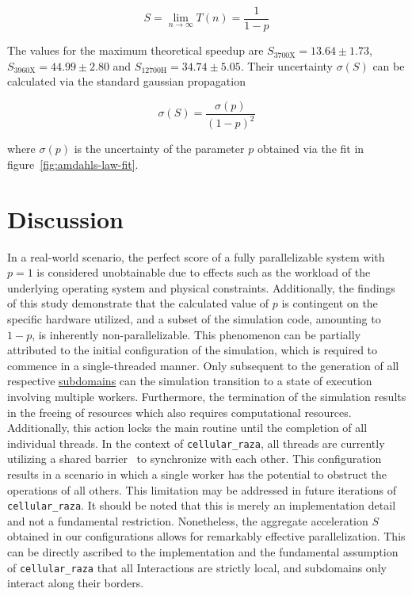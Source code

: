 \documentclass[fontsize=11pt,a4paper]{article}
\begin{document}
\begin{equation}
    S = \lim\limits_{n\rightarrow\infty} T(n) = \frac{1}{1-p}
    \label{eq:amdahls-law-maximum-speedup}
\end{equation}

The values for the maximum theoretical speedup are $S_\text{3700X}=13.64\pm1.73$,
$S_\text{3960X}=44.99\pm2.80$ and $S_\text{12700H}=34.74\pm5.05$.
Their uncertainty $\sigma(S)$ can be calculated via the standard gaussian propagation

\begin{equation}
    \sigma(S) = \frac{\sigma(p)}{(1-p)^2}
\end{equation}

where $\sigma(p)$ is the uncertainty of the parameter $p$ obtained via the fit in
figure~\ref{fig:amdahls-law-fit}.

\section{Discussion}
In a real-world scenario, the perfect score of a fully parallelizable system with $p=1$ is
considered unobtainable due to effects such as the workload of the underlying operating system and
physical constraints.
Additionally, the findings of this study demonstrate that the calculated value of $p$ is contingent
on the specific hardware utilized, and a subset of the simulation code, amounting to $1-p$, is
inherently non-parallelizable.
This phenomenon can be partially attributed to the initial configuration of the simulation, which is
required to commence in a single-threaded manner.
Only subsequent to the generation of all respective
\href{https://cellular-raza.com/docs/cellular_raza_core/backend/chili/struct.SubDomainBox.html}
{subdomains} can the simulation transition to a state of execution involving multiple workers.
Furthermore, the termination of the simulation results in the freeing of resources which also
requires computational resources.
Additionally, this action locks the main routine until the completion of all individual threads.
In the context of \texttt{cellular\_raza}, all threads are currently utilizing a shared
barrier~\cite{GjengsetHurdles2018} to synchronize with each other.
This configuration results in a scenario in which a single worker has the potential to obstruct the
operations of all others.
This limitation may be addressed in future iterations of \texttt{cellular\_raza}.
It should be noted that this is merely an implementation detail and not a fundamental restriction.
Nonetheless, the aggregate acceleration $S$ obtained in our configurations allows for remarkably
effective parallelization.
This can be directly ascribed to the implementation and the fundamental assumption of
\texttt{cellular\_raza} that all Interactions are strictly local, and subdomains only interact along
their borders.
\end{document}
